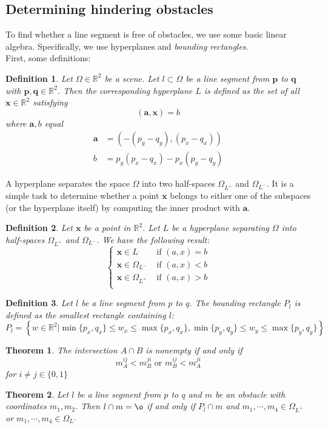 \documentclass{article}
\renewcommand{\vec}[1]{\mathbf{#1}}
\newtheorem{newdef}{Definition}
\newtheorem{newthm}{Theorem}
\begin{document}
\subsection{Determining hindering obstacles}
\label{sec:crosses_obstacle}
To find whether a line segment is free of obstacles, we use some basic linear algebra. Specifically, we use hyperplanes and \emph{bounding rectangles}. 
\ \\
First, some definitions:
\begin{newdef}
	Let $\Omega \in \mathbb{R}^2$ be a scene.
	Let $l\subset \Omega$ be a line segment from $\vec{p}$ to $\vec{q}$ with $\vec{p},\vec{q} \in \mathbb{R}^2$. Then the corresponding hyperplane $L$ is defined as the set of all $\vec{x}\in\mathbb{R}^2$ satisfying
	\begin{equation}
		(\vec{a},\vec{x})=b
	\end{equation}
	where $\vec{a},b$ equal 
	\begin{align}
		\vec{a} &= \left( -(p_y-q_y),(p_x-q_x)\right)\\
		b   &=  p_y(p_x - q_x) - p_x(p_y - q_y)
	\end{align}
\end{newdef}
A hyperplane separates the space $\Omega$ into two half-spaces $\Omega_{L^+}$ and $\Omega_{L^-}$. It is a simple task to determine whether a point $\vec{x}$ belongs to either one of the subspaces (or the hyperplane itself) by computing the inner product with $\vec{a}$.
\begin{newdef}
	Let $\vec{x}$ be a point in $\mathbb{R}^2$. Let $L$ be a hyperplane separating $\Omega$ into half-spaces $\Omega_{L^+}$ and $\Omega_{L^-}$. We have the following result:
	\begin{equation}
		\begin{cases}
			\vec{x} \in L&\mbox{ if }(a,x) = b\\
			\vec{x}  \in \Omega_{L^-} &\mbox{ if }(a,x) < b\\
			\vec{x}  \in \Omega_{L^+} &\mbox{ if }(a,x) > b\\
		\end{cases}
		\label{eq:separation}
	\end{equation}
\end{newdef}
\begin{newdef}
	Let $l$ be a line segment from $p$ to $q$. The bounding rectangle $P_l$ is defined as the smallest rectangle containing $l$:
	\begin{equation}
		P_l = \left\{ w\in\mathbb{R}^2| \min\{p_x,q_x\} \leq w_x \leq \max\{p_x,q_x\}, \min\{p_y,q_y\} \leq w_y \leq \max\{p_y,q_y\}  \right\}
		\label{eq:bounding_rect}
	\end{equation}
\end{newdef}
\begin{newthm}
	The intersection $A\cap B$ is nonempty if and only if 
	$$m^{ij}_A < m^{ji}_B \mbox{ or } m^{ij}_B < m^{ji}_A$$
	for $i \neq j \in \{0,1\}$
\end{newthm}
\begin{newthm}
	Let $l$ be a line segment from $p$ to $q$ and $m$ be an obstacle with coordinates $m_1,m_2$. Then $l \cap m = \o$ if and only if $P_l \cap m$ and $m_1,\cdots,m_4 \in \Omega_{L^+}$ or $m_1,\cdots,m_4 \in \Omega_{L^-}$ 
	\label{thm:sep}
\end{newthm}
\newpage
\end{document}
